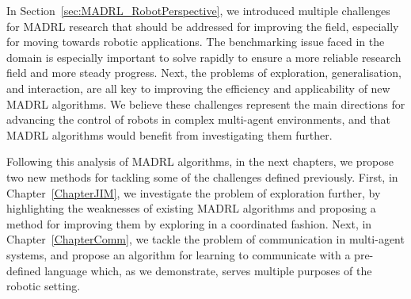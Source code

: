 In Section~\ref{sec:MADRL_RobotPerspective}, we introduced multiple challenges for MADRL research that should be addressed for improving the field, especially for moving towards robotic applications. The benchmarking issue faced in the domain is especially important to solve rapidly to ensure a more reliable research field and more steady progress. Next, the problems of exploration, generalisation, and interaction, are all key to improving the efficiency and applicability of new MADRL algorithms. We believe these challenges represent the main directions for advancing the control of robots in complex multi-agent environments, and that MADRL algorithms would benefit from investigating them further. 

Following this analysis of MADRL algorithms, in the next chapters, we propose two new methods for tackling some of the challenges defined previously. First, in Chapter~\ref{ChapterJIM}, we investigate the problem of exploration further, by highlighting the weaknesses of existing MADRL algorithms and proposing a method for improving them by exploring in a coordinated fashion. Next, in Chapter~\ref{ChapterComm}, we tackle the problem of communication in multi-agent systems, and propose an algorithm for learning to communicate with a pre-defined language which, as we demonstrate, serves multiple purposes of the robotic setting. 